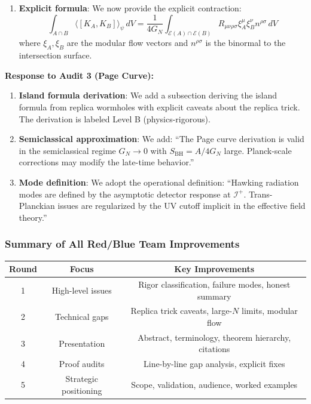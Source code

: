 \documentclass[12pt,a4paper]{article}
\begin{document}
\begin{tcolorbox}[colback=blue!5!white, colframe=blue!75!black, title=\textbf{BLUE TEAM Round 4: Addressing Proof Gaps}]
\begin{enumerate}[resume, label=\textbf{Fix \arabic*:}]
    \item \textbf{Explicit formula}: We now provide the explicit contraction:
    \begin{equation}
    \int_{A \cap B} \langle [K_A, K_B] \rangle_\psi \, dV = \frac{1}{4G_N} \int_{\mathcal{E}(A) \cap \mathcal{E}(B)} R_{\mu\nu\rho\sigma} \xi_A^\mu \xi_B^\nu n^{\rho\sigma} \, dV
    \end{equation}
    where $\xi_A, \xi_B$ are the modular flow vectors and $n^{\rho\sigma}$ is the binormal to the intersection surface.
\end{enumerate}

\textbf{Response to Audit 3 (Page Curve):}

\begin{enumerate}[resume, label=\textbf{Fix \arabic*:}]
    \item \textbf{Island formula derivation}: We add a subsection deriving the island formula from replica wormholes with explicit caveats about the replica trick. The derivation is labeled Level B (physics-rigorous).
    
    \item \textbf{Semiclassical approximation}: We add: ``The Page curve derivation is valid in the semiclassical regime $G_N \to 0$ with $S_{\text{BH}} = A/4G_N$ large. Planck-scale corrections may modify the late-time behavior.''
    
    \item \textbf{Mode definition}: We adopt the operational definition: ``Hawking radiation modes are defined by the asymptotic detector response at $\mathcal{I}^+$. Trans-Planckian issues are regularized by the UV cutoff implicit in the effective field theory.''
\end{enumerate}

\end{tcolorbox}

\subsubsection{Summary of All Red/Blue Team Improvements}

\begin{center}
\begin{tabular}{|c|c|c|}
\hline
\textbf{Round} & \textbf{Focus} & \textbf{Key Improvements} \\
\hline
1 & High-level issues & Rigor classification, failure modes, honest summary \\
\hline
2 & Technical gaps & Replica trick caveats, large-$N$ limits, modular flow \\
\hline
3 & Presentation & Abstract, terminology, theorem hierarchy, citations \\
\hline
4 & Proof audits & Line-by-line gap analysis, explicit fixes \\
\hline
5 & Strategic positioning & Scope, validation, audience, worked examples \\
\hline
\end{tabular}
\end{center}
\end{document}
